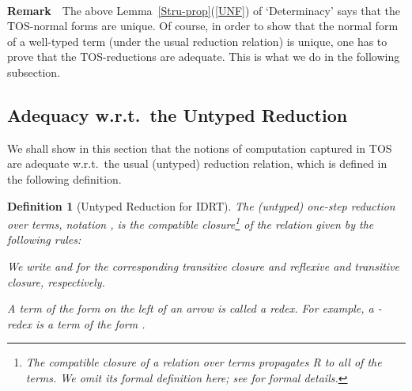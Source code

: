 \documentclass[submission,copyright,creativecommons]{eptcs}
\newtheorem{defn}[definition]{Definition}
\newcommand{\remark}{\ \\{\bf Remark}\ }
\newcommand{\wrt}{{w.r.t.}}
\begin{document}
\remark\ The above Lemma~\ref{Stru-prop}(\ref{UNF}) of `Determinacy' says that the TOS-normal forms are unique.  Of course, in order to show that the normal form of a well-typed term (under the usual reduction relation) is unique, one has to prove that the TOS-reductions are adequate.  This is what we do in the following subsection.

\subsection{Adequacy \wrt\ the Untyped Reduction}
\label{subsec: adeq}

We shall show in this section that the notions of computation captured in TOS are adequate \wrt\ the usual (untyped) reduction relation, which is defined in the following definition.

\begin{defn}[Untyped Reduction for IDRT] \label{untyped-red}
The (untyped) one-step reduction over terms, notation , is the compatible closure\footnote{The compatible closure of a relation  over terms propagates R to all of the terms.  We omit its formal definition here; see \cite{healf:thesis,Fen10} for formal details.} of the relation given by the following rules:

We write  and  for the corresponding transitive closure and reflexive and transitive closure, respectively.

A term of the form on the left of an arrow is called a \emph{redex}.  For example, a -redex is a term of the form .
\end{defn}
\end{document}
